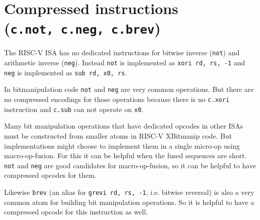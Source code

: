 

%
%
%
%
%
%
%
%


\section{Compressed instructions (\texttt{c.not,\ c.neg,\ c.brev})}

The RISC-V ISA has no dedicated instructions for bitwise inverse (\texttt{not})
and arithmetic inverse (\texttt{neg}). Instead \texttt{not} is implemented as
\texttt{xori\ rd,\ rs,\ -1} and \texttt{neg} is implemented as
\texttt{sub\ rd,\ x0,\ rs}.

In bitmanipulation code \texttt{not} and \texttt{neg} are very common operations. But
there are no compressed encodings for those operations because there is no \texttt{c.xori}
instruction and \texttt{c.sub} can not operate on \texttt{x0}.

Many bit manipulation operations that have dedicated opcodes in other ISAs
must be constructed from smaller atoms in RISC-V XBitmanip code. But
implementations might choose to implement them in a single micro-op using
macro-op-fusion. For this it can be helpful when the fused sequences are short.
\texttt{not} and \texttt{neg} are good candidates for macro-op-fusion, so
it can be helpful to have compressed opcodes for them.

Likewise \texttt{brev} (an alias for \texttt{grevi\ rd,\ rs,\ -1}, i.e. bitwise
reversal) is also a very common atom for building bit manipulation operations. So it
is helpful to have a compressed opcode for this instruction as well.

